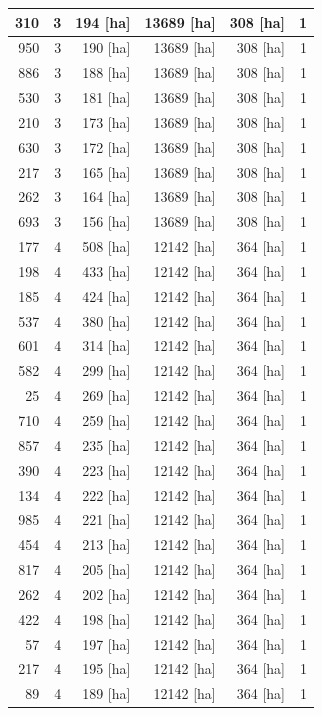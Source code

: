 \documentclass[11pt,]{book}
\begin{document}
\begin{table}
\begin{tabular}[t]{r|r|r|r|r|r}
\hline
310 & 3 & 194 [ha] & 13689 [ha] & 308 [ha] & 1\\
\hline
950 & 3 & 190 [ha] & 13689 [ha] & 308 [ha] & 1\\
\hline
886 & 3 & 188 [ha] & 13689 [ha] & 308 [ha] & 1\\
\hline
530 & 3 & 181 [ha] & 13689 [ha] & 308 [ha] & 1\\
\hline
210 & 3 & 173 [ha] & 13689 [ha] & 308 [ha] & 1\\
\hline
630 & 3 & 172 [ha] & 13689 [ha] & 308 [ha] & 1\\
\hline
217 & 3 & 165 [ha] & 13689 [ha] & 308 [ha] & 1\\
\hline
262 & 3 & 164 [ha] & 13689 [ha] & 308 [ha] & 1\\
\hline
693 & 3 & 156 [ha] & 13689 [ha] & 308 [ha] & 1\\
\hline
177 & 4 & 508 [ha] & 12142 [ha] & 364 [ha] & 1\\
\hline
198 & 4 & 433 [ha] & 12142 [ha] & 364 [ha] & 1\\
\hline
185 & 4 & 424 [ha] & 12142 [ha] & 364 [ha] & 1\\
\hline
537 & 4 & 380 [ha] & 12142 [ha] & 364 [ha] & 1\\
\hline
601 & 4 & 314 [ha] & 12142 [ha] & 364 [ha] & 1\\
\hline
582 & 4 & 299 [ha] & 12142 [ha] & 364 [ha] & 1\\
\hline
25 & 4 & 269 [ha] & 12142 [ha] & 364 [ha] & 1\\
\hline
710 & 4 & 259 [ha] & 12142 [ha] & 364 [ha] & 1\\
\hline
857 & 4 & 235 [ha] & 12142 [ha] & 364 [ha] & 1\\
\hline
390 & 4 & 223 [ha] & 12142 [ha] & 364 [ha] & 1\\
\hline
134 & 4 & 222 [ha] & 12142 [ha] & 364 [ha] & 1\\
\hline
985 & 4 & 221 [ha] & 12142 [ha] & 364 [ha] & 1\\
\hline
454 & 4 & 213 [ha] & 12142 [ha] & 364 [ha] & 1\\
\hline
817 & 4 & 205 [ha] & 12142 [ha] & 364 [ha] & 1\\
\hline
262 & 4 & 202 [ha] & 12142 [ha] & 364 [ha] & 1\\
\hline
422 & 4 & 198 [ha] & 12142 [ha] & 364 [ha] & 1\\
\hline
57 & 4 & 197 [ha] & 12142 [ha] & 364 [ha] & 1\\
\hline
217 & 4 & 195 [ha] & 12142 [ha] & 364 [ha] & 1\\
\hline
89 & 4 & 189 [ha] & 12142 [ha] & 364 [ha] & 1\\

\end{tabular}
\end{table}
\end{document}
